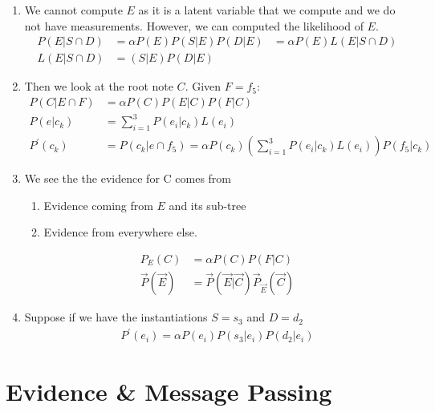 \documentclass[12pt,twoside]{article}
\begin{document}
\begin{enumerate}
\begin{enumerate}
\item We cannot compute $E$ as it is a latent variable that we compute and we do not have measurements. However, we can computed the likelihood of $E$.
\begin{align*}
P(E \vert S\cap D) &= \alpha P(E)P(S\vert E)P(D\vert E)& = \alpha P(E) L(E\vert S \cap D)\\
L(E\vert S \cap D)& = (S\vert E)P(D\vert E)
\end{align*}  

\item Then we look at the root note $C$. Given $F=f_5$:
\begin{align*}
P(C \vert E \cap F)& = \alpha P(C) P(E\vert C)P(F\vert C)\\
P(e\vert c_k) &= \sum_{i=1}^3 P(e_i\vert c_k)L(e_i)\\
P^\prime (c_k)& = P(c_k\vert e \cap f_5)= \alpha P(c_k)\left(\sum_{i=1}^3 P(e_i\vert c_k)L(e_i)\right)P(f_5\vert c_k)
\end{align*}

\item We see the the evidence for C comes from
\begin{enumerate}
\item Evidence coming from $E$ and its sub-tree
\item Evidence from everywhere else.
\end{enumerate}
\begin{align*}
P_E(C) & = \alpha P(C) P(F\vert C)\\
\vec{P}(\vec{E}) & = \vec{P}(\vec{E}\vert \vec{C})\vec{P}_\vec{E}(\vec{C})
\end{align*}

\item Suppose if we have the instantiations $S=s_3$ and $D=d_2$
\begin{align*}
P^\prime(e_i) = \alpha P(e_i)P(s_3\vert e_i)P(d_2\vert e_i)
\end{align*}

\end{enumerate}

\end{enumerate}

\newpage

\section{Evidence \& Message Passing}
\end{document}
